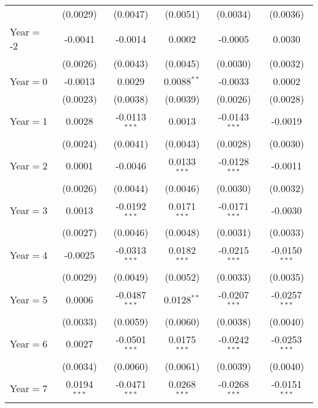 \begin{table}[htbp]
\begin{tabular}{lccccc}
                           & (0.0029)        & (0.0047)        & (0.0051)       & (0.0034)        & (0.0036)\\
      Year$=$-2            & -0.0041         & -0.0014         & 0.0002         & -0.0005         & 0.0030\\
                           & (0.0026)        & (0.0043)        & (0.0045)       & (0.0030)        & (0.0032)\\
      Year$=$0             & -0.0013         & 0.0029          & 0.0088$^{**}$  & -0.0033         & 0.0002\\
                           & (0.0023)        & (0.0038)        & (0.0039)       & (0.0026)        & (0.0028)\\
      Year$=$1             & 0.0028          & -0.0113$^{***}$ & 0.0013         & -0.0143$^{***}$ & -0.0019\\
                           & (0.0024)        & (0.0041)        & (0.0043)       & (0.0028)        & (0.0030)\\
      Year$=$2             & 0.0001          & -0.0046         & 0.0133$^{***}$ & -0.0128$^{***}$ & -0.0011\\
                           & (0.0026)        & (0.0044)        & (0.0046)       & (0.0030)        & (0.0032)\\
      Year$=$3             & 0.0013          & -0.0192$^{***}$ & 0.0171$^{***}$ & -0.0171$^{***}$ & -0.0030\\
                           & (0.0027)        & (0.0046)        & (0.0048)       & (0.0031)        & (0.0033)\\
      Year$=$4             & -0.0025         & -0.0313$^{***}$ & 0.0182$^{***}$ & -0.0215$^{***}$ & -0.0150$^{***}$\\
                           & (0.0029)        & (0.0049)        & (0.0052)       & (0.0033)        & (0.0035)\\
      Year$=$5             & 0.0006          & -0.0487$^{***}$ & 0.0128$^{**}$  & -0.0207$^{***}$ & -0.0257$^{***}$\\
                           & (0.0033)        & (0.0059)        & (0.0060)       & (0.0038)        & (0.0040)\\
      Year$=$6             & 0.0027          & -0.0501$^{***}$ & 0.0175$^{***}$ & -0.0242$^{***}$ & -0.0253$^{***}$\\
                           & (0.0034)        & (0.0060)        & (0.0061)       & (0.0039)        & (0.0040)\\
      Year$=$7             & 0.0194$^{***}$  & -0.0471$^{***}$ & 0.0268$^{***}$ & -0.0268$^{***}$ & -0.0151$^{***}$\\

\end{tabular}
\end{table}
